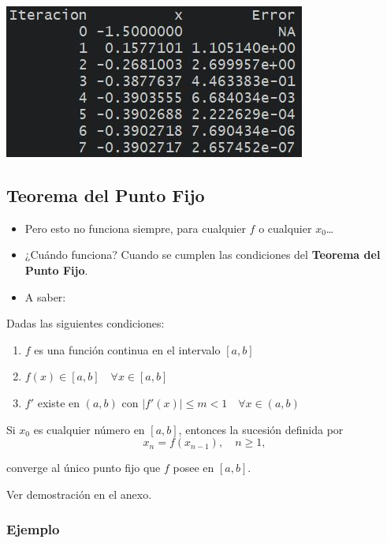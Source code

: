 \documentclass[openany]{book}
\providecommand{\tightlist}{%
  \setlength{\itemsep}{0pt}\setlength{\parskip}{0pt}}
\begin{document}
\begin{center}\includegraphics[width=0.5\linewidth]{Plots/U2/rtdo} \end{center}

\hypertarget{teorema-del-punto-fijo}{%
\subsection{Teorema del Punto Fijo}\label{teorema-del-punto-fijo}}

\begin{itemize}
\tightlist
\item
  Pero esto no funciona siempre, para cualquier \(f\) o cualquier \(x_0\)\ldots{}
\item
  ¿Cuándo funciona? Cuando se cumplen las condiciones del \textbf{Teorema del Punto Fijo}.
\item
  A saber:
\end{itemize}

Dadas las siguientes condiciones:

\begin{enumerate}
\def\labelenumi{\alph{enumi}.}
\tightlist
\item
  \(f\) es una función continua en el intervalo \([a, b]\)
\item
  \(f(x) \in [a, b] \quad \forall x \in [a, b]\)
\item
  \(f'\) existe en \((a, b)\) con \(|f'(x)| \le m < 1 \quad \forall x \in (a, b)\)
\end{enumerate}

Si \(x_0\) es cualquier número en \([a, b]\), entonces la sucesión definida por
\[ x_n = f(x_{n-1}), \quad n \ge 1,\]

converge al único punto fijo que \(f\) posee en \([a, b]\).

Ver demostración en el anexo.

\hypertarget{ejemplo-4}{%
\subsubsection*{Ejemplo}\label{ejemplo-4}}
\end{document}

